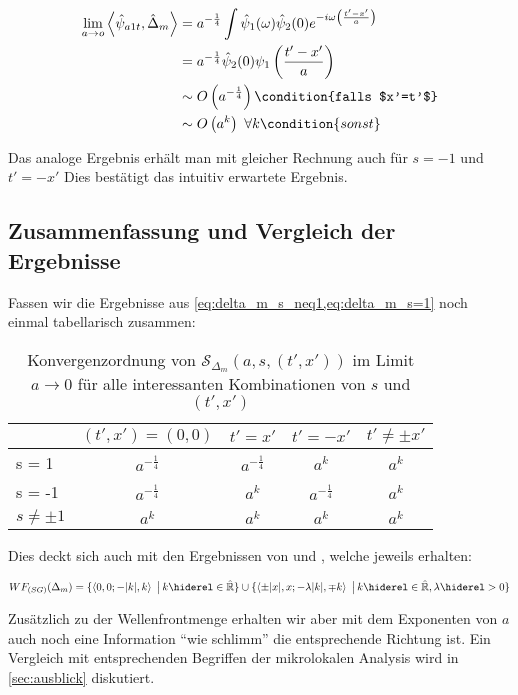 \begin{align}
\lim_{a \to o}
\left\langle\hat \psi_{a1t} ,\hat \Delta_m\right\rangle
&=
a^{-\frac{1}{4}} \int \hat \psi_1(\omega) \hat \psi_2 (0)
    e^{-i\omega \left(\frac{t'-x'}{a}\right)} \nonumber
\\ \nonumber &=
a^{-\frac{1}{4}} \hat \psi_2 (0) \psi_1\left(\frac{t'-x'}{a}\right)
\\ \nonumber &\sim
O\left(a^{-\frac{1}{4}}\right) \condition{falls $x'=t'$}
\\ &\sim O
\left(a^k\right) ~ \forall k  \condition{sonst}
\label{eq:delta_m_s=1}
\end{align}

Das analoge Ergebnis erhält man mit gleicher Rechnung auch für $s=-1$ und $t' = -x'$
Dies bestätigt das intuitiv erwartete Ergebnis.

\subsection{Zusammenfassung und Vergleich der Ergebnisse}
 Fassen wir die Ergebnisse aus
 \cref{eq:delta_m_s_neq1,eq:delta_m_s=1} noch einmal tabellarisch zusammen:

\begin{table}[h]
\centering
\begin{tabular}{l|cccc}
        & \multicolumn{1}{l}{$(t', x') = (0, 0)$} & \multicolumn{1}{l}{$t' = x'$} & \multicolumn{1}{l}{$t' = -x'$} & \multicolumn{1}{l}{$t' \neq \pm x'$} \\ \hline
s = 1   & $a^{-\frac{1}{4}}$    & $a^{-\frac{1}{4}}$    & $a^k$  & $a^k$    \\
s = -1  & $a^{-\frac{1}{4}}$    & $a^k$    & $a^{-\frac{1}{4}}$  & $a^k$    \\
$s \neq \pm 1$  & $a^k$         & $a^k$    & $a^k$               & $a^k$    \\
\end{tabular}
\caption{Konvergenzordnung von $\mathcal{S}_{\Delta_m} (a,s,(t',x'))$ im Limit $a \rightarrow 0$ für alle interessanten Kombinationen von $s$ und $(t',x')$}
\label{tab:wavefront_set_massive_two_point_function}
\end{table}


Dies deckt sich auch mit den Ergebnissen von \textcite{Schulz2014} und \textcite{Hoermander1985}, welche jeweils erhalten:

\begin{dmath*}
    WF_{(SG)}(\Delta_m) =
    \{\left\langle 0,0; -|k|,k\right\rangle\ \big|\, k \hiderel\in \hat{\mathbb{R}}\}
    \cup
    \{\left\langle \pm |x|, x; -\lambda |k|,\mp k\right\rangle\ \big|\, k \hiderel\in \hat{\mathbb{R}}, \lambda \hiderel> 0\}
\end{dmath*}


Zusätzlich zu der Wellenfrontmenge erhalten wir aber mit dem Exponenten von $a$ auch noch eine Information "`wie schlimm"' die entsprechende Richtung ist. Ein Vergleich mit entsprechenden Begriffen der mikrolokalen Analysis wird in \cref{sec:ausblick} diskutiert.
